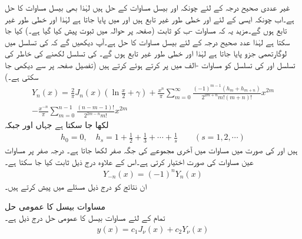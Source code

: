 غیر عددی صحیح درجہ  کے لئے چونکہ  اور  بیسل مساوات کے حل ہیں لہٰذا    بھی بیسل مساوات کا حل ہے۔اب چونکہ ایسی  کے لئے  اور  خطی طور غیر تابع ہیں اور  میں  پایا جاتا ہے لہٰذا  اور  خطی طور غیر تابع ہوں گے۔مزید یہ کہ مساوات -ب کو ثابت (صفحہ  پر حوالہ \cite{حوالہ_کریزگ_ب_اٹھارہ} میں ثبوت پیش کیا گیا ہے۔) کیا جا سکتا ہے لہٰذا عدد صحیح درجہ کے لئے  بیسل مساوات کا حل ہے۔آپ دیکھیں گے کہ  کی تسلسل میں لوگارتھمی جزو پایا جاتا ہے لہٰذا  اور  خطی طور غیر تابع ہوں گے۔ کی تسلسل لکھنے کی خاطر  کی تسلسل  اور  کی تسلسل  کو مساوات -الف میں پر کرتے ہوئے  کرتے ہیں (تفصیل صفحہ  پر \cite{حوالہ_کریزگ_ب_اٹھارہ} سے دیکھی جا سکتی ہے۔)
\begin{multline}\label{مساوات_بیسل_نیومن_عدد_صحیح_الف}
Y_n(x)=\frac{2}{\pi}J_n(x)\left(\ln \frac{x}{2}+\gamma\right)+\frac{x^n}{\pi}\sum_{m=0}^{\infty} \frac{(-1)^{m-1}(h_m+h_{m+n})}{2^{2m+n}m!(m+n)!}x^{2m}\\
-\frac{x^{-n}}{\pi}\sum_{m=0}^{n-1}\frac{(n-m-1)!}{2^{2m-n}m!}x^{2m}
\end{multline}
لکھا جا سکتا ہے جہاں  اور   جبکہ
\begin{align*}
h_0=0,\quad h_s=1+\frac{1}{2}+\frac{1}{3}+\cdots+\frac{1}{s} \quad \quad (s=1,2,\cdots)
\end{align*}
ہیں اور  کی صورت میں مساوات  میں آخری مجموعے کی جگہ صفر لکھا جاتا ہے۔ درجہ صفر  پر  مساوات  عین مساوات  کی صورت اختیار کرتی ہے۔اس کے علاوہ درج ذیل ثابت کیا جا سکتا ہے۔
\begin{align}
Y_{-n}(x)=(-1)^nY_n(x)
\end{align}
ان نتائج کو درج ذیل مسئلے میں پیش کرتے ہیں۔

 مساوات بیسل کا عمومی حل\\
تمام  کے لئے مساوات بیسل کا عمومی حل درج ذیل ہے۔
\begin{align}
y(x)=c_1J_{\nu}(x)+c_2Y_{\nu}(x)
\end{align}

